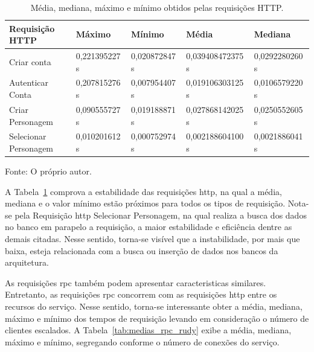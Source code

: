 \begin{table}[htb!]
    \centering
    \caption{Média, mediana, máximo e mínimo obtidos pelas requisições HTTP.}
    \label{tab:medias_http_rudy}
    \begin{adjustbox}{width=1\textwidth}
    \begin{tabular}{|l|l|l|l|l|}
    \hline
    Requisição HTTP       & Máximo      & Mínimo        & Média            & Mediana          \\ \hline
    Criar conta           & 0,221395227 s & 0,020872847 s & 0,039408472375 s & 0,0292280260 s \\ \hline
    Autenticar Conta      & 0,207815276 s & 0,007954407 s & 0,019106303125 s & 0,0106579220 s \\ \hline
    Criar Personagem      & 0,090555727 s & 0,019188871 s & 0,027868142025 s & 0,0250552605 s \\ \hline
    Selecionar Personagem & 0,010201612 s & 0,000752974 s & 0,002188604100 s & 0,0021886041 s \\ \hline
    \end{tabular}
    \end{adjustbox}

    Fonte: O próprio autor.
\end{table}

A Tabela~\ref{tab:medias_http_rudy} comprova a estabilidade das requisições \ac{http}, na qual a média, mediana e o valor mínimo estão próximos para todos os tipos de requisição.
%
Nota-se pela Requisição \ac{http} Selecionar Personagem, na qual realiza a busca dos dados no banco em parapelo a requisição, a maior estabilidade e eficiência dentre as demais citadas.
%
Nesse sentido, torna-se visível que a instabilidade, por mais que baixa, esteja relacionada com a busca ou inserção de dados nos bancos da arquitetura.

As requisições \ac{rpc} também podem apresentar caracteristicas similares.
%
Entretanto, as requisições \ac{rpc} concorrem com as requisições \ac{http} entre os recursos do serviço.
%
Nesse sentido, torna-se interessante obter a média, mediana, máximo e mínimo dos tempos de requisição levando em consideração o número de clientes escalados.
%
A Tabela~\ref{tab:medias_rpc_rudy} exibe a média, mediana, máximo e mínimo, segregando conforme o número de conexões do serviço.
